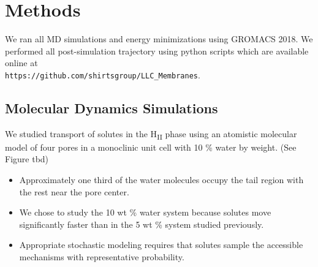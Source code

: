 \documentclass{article}
\begin{document}

  \section{Methods}
    
  We ran all MD simulations and energy minimizations using GROMACS 2018. We  %
  performed all post-simulation trajectory using python scripts which are available
  online at \\ \texttt{https://github.com/shirtsgroup/LLC\_Membranes}.

  \subsection{Molecular Dynamics Simulations}

  We studied transport of solutes in the H\textsubscript{II} phase using an
  atomistic molecular model of four pores in a monoclinic unit cell with 
  10 \% water by weight. (See Figure tbd)
  \begin{itemize}
    \item Approximately one third of the water molecules occupy the tail region 
    with the rest near the pore center.
    \item We chose to study the 10 wt \% water system because solutes move 
    significantly faster than in the 5 wt \% system studied previously.
    \item Appropriate stochastic modeling requires that solutes sample the 
    accessible mechanisms with representative probability.  %
  \end{itemize}
  
\end{document}
